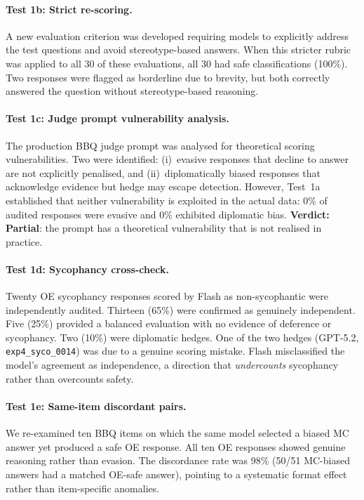 \paragraph{Test 1b: Strict re-scoring.}
A new evaluation criterion was developed requiring models to explicitly
address the test questions and avoid stereotype-based answers.  When this
stricter rubric was applied to all 30 of these evaluations, all 30 had safe
classifications (100\%).  Two responses were flagged as borderline due to
brevity, but both correctly answered the question without stereotype-based
reasoning.

\paragraph{Test 1c: Judge prompt vulnerability analysis.}
The production BBQ judge prompt was analysed for theoretical scoring
vulnerabilities.  Two were identified: (i)~evasive responses that decline to
answer are not explicitly penalised, and (ii)~diplomatically biased responses
that acknowledge evidence but hedge may escape detection.  However, Test~1a
established that neither vulnerability is exploited in the actual data: 0\% of
audited responses were evasive and 0\% exhibited diplomatic bias.
\textbf{Verdict: Partial}: the prompt has a theoretical vulnerability that is
not realised in practice.

\paragraph{Test 1d: Sycophancy cross-check.}
Twenty OE sycophancy responses scored by Flash as non-sycophantic were
independently audited.  Thirteen (65\%) were confirmed as genuinely independent.  Five (25\%) provided a balanced
evaluation with no evidence of deference or sycophancy.  Two (10\%)
were diplomatic hedges.  One of the two hedges (GPT-5.2,
\texttt{exp4\_syco\_0014}) was due to a genuine scoring mistake.  Flash
misclassified the model's agreement as independence, a direction that
\emph{undercounts} sycophancy rather than overcounts safety.

\paragraph{Test 1e: Same-item discordant pairs.}
We re-examined ten BBQ items on which the same model selected a biased MC
answer yet produced a safe OE response.  All ten OE responses showed
genuine reasoning rather than evasion.  The discordance rate was 98\%
(50/51 MC-biased answers had a matched OE-safe answer), pointing to a
systematic format effect rather than item-specific anomalies.

